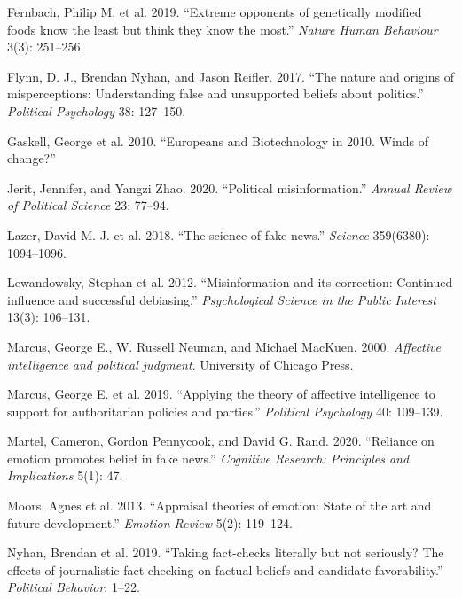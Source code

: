 \documentclass[
  12pt,
]{article}
\begin{document}
\leavevmode\hypertarget{ref-fernbach2019extreme}{}%
Fernbach, Philip M. et al. 2019. ``Extreme opponents of genetically modified foods know the least but think they know the most.'' \emph{Nature Human Behaviour} 3(3): 251--256.

\leavevmode\hypertarget{ref-flynn2017nature}{}%
Flynn, D. J., Brendan Nyhan, and Jason Reifler. 2017. ``The nature and origins of misperceptions: Understanding false and unsupported beliefs about politics.'' \emph{Political Psychology} 38: 127--150.

\leavevmode\hypertarget{ref-gaskell2010europeans}{}%
Gaskell, George et al. 2010. ``Europeans and Biotechnology in 2010. Winds of change?''

\leavevmode\hypertarget{ref-jerit2020political}{}%
Jerit, Jennifer, and Yangzi Zhao. 2020. ``Political misinformation.'' \emph{Annual Review of Political Science} 23: 77--94.

\leavevmode\hypertarget{ref-lazer2018science}{}%
Lazer, David M. J. et al. 2018. ``The science of fake news.'' \emph{Science} 359(6380): 1094--1096.

\leavevmode\hypertarget{ref-lewandowsky2012misinformation}{}%
Lewandowsky, Stephan et al. 2012. ``Misinformation and its correction: Continued influence and successful debiasing.'' \emph{Psychological Science in the Public Interest} 13(3): 106--131.

\leavevmode\hypertarget{ref-marcus2000affective}{}%
Marcus, George E., W. Russell Neuman, and Michael MacKuen. 2000. \emph{Affective intelligence and political judgment}. University of Chicago Press.

\leavevmode\hypertarget{ref-marcus2019applying}{}%
Marcus, George E. et al. 2019. ``Applying the theory of affective intelligence to support for authoritarian policies and parties.'' \emph{Political Psychology} 40: 109--139.

\leavevmode\hypertarget{ref-martel2020reliance}{}%
Martel, Cameron, Gordon Pennycook, and David G. Rand. 2020. ``Reliance on emotion promotes belief in fake news.'' \emph{Cognitive Research: Principles and Implications} 5(1): 47.

\leavevmode\hypertarget{ref-moors2013appraisal}{}%
Moors, Agnes et al. 2013. ``Appraisal theories of emotion: State of the art and future development.'' \emph{Emotion Review} 5(2): 119--124.

\leavevmode\hypertarget{ref-nyhan2019taking}{}%
Nyhan, Brendan et al. 2019. ``Taking fact-checks literally but not seriously? The effects of journalistic fact-checking on factual beliefs and candidate favorability.'' \emph{Political Behavior}: 1--22.
\end{document}
